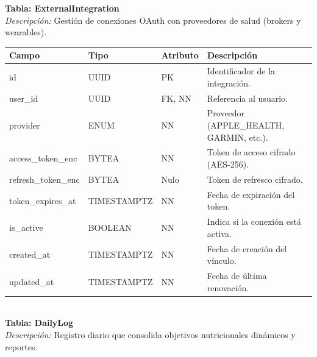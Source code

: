 \documentclass[12pt]{article}
\begin{document}
\newpage
\noindent\textbf{Tabla: ExternalIntegration} \\
\textit{Descripción:} Gestión de conexiones OAuth con proveedores de salud (brokers y wearables).
\begin{table}[h!]
    \centering
    \renewcommand{\arraystretch}{1.2}
    \small
    \begin{tabular}{|p{3.5cm}|p{2.7cm}|p{2cm}|p{6.5cm}|}
        \hline
        \rowcolor[HTML]{EFEFEF}
        \textbf{Campo} & \textbf{Tipo} & \textbf{Atributo} & \textbf{Descripción} \\ \hline
        id & UUID & PK & Identificador de la integración. \\ \hline
        user\_id & UUID & FK, NN & Referencia al usuario. \\ \hline
        provider & ENUM & NN & Proveedor (APPLE\_HEALTH, GARMIN, etc.). \\ \hline
        access\_token\_enc & BYTEA & NN & Token de acceso cifrado (AES-256). \\ \hline
        refresh\_token\_enc & BYTEA & Nulo & Token de refresco cifrado. \\ \hline
        token\_expires\_at & TIMESTAMPTZ & NN & Fecha de expiración del token. \\ \hline
        is\_active & BOOLEAN & NN & Indica si la conexión está activa. \\ \hline
        created\_at & TIMESTAMPTZ & NN & Fecha de creación del vínculo. \\ \hline
        updated\_at & TIMESTAMPTZ & NN & Fecha de última renovación. \\ \hline
    \end{tabular}
\end{table}
\\
\noindent\textbf{Tabla: DailyLog} \\
\textit{Descripción:} Registro diario que consolida objetivos nutricionales dinámicos y reportes.
\end{document}
